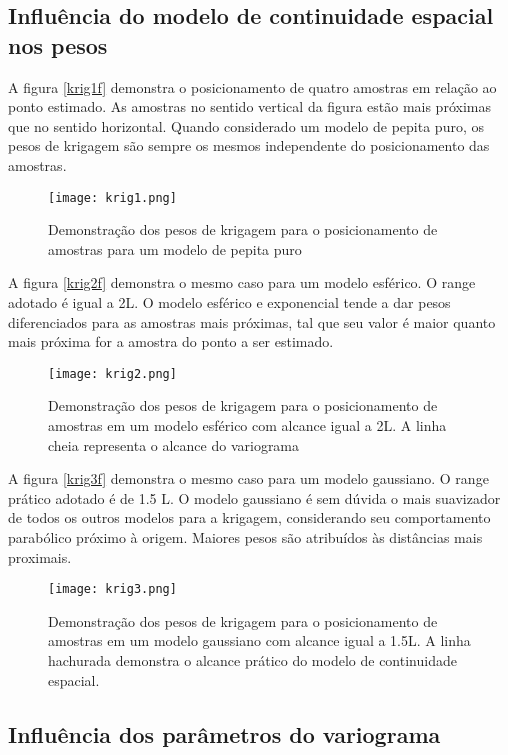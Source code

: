 \subsection{Influência do modelo de continuidade espacial nos pesos}

A figura \eqref{krig1f} demonstra o posicionamento de quatro amostras em relação ao ponto estimado. As amostras no sentido vertical da figura estão mais próximas que no sentido horizontal. Quando considerado um modelo de pepita puro, os pesos de krigagem são sempre os mesmos independente do posicionamento das amostras.

\begin{figure}[H]
  	\centering
  	\texttt{[image: krig1.png]}
  	\caption{Demonstração dos pesos de krigagem para o posicionamento de amostras para um modelo de pepita puro}
  	\label{krig1f}
\end{figure}

A figura \eqref{krig2f} demonstra o mesmo caso para um modelo esférico. O range adotado é igual a 2L. O modelo esférico e exponencial tende a dar pesos diferenciados para as amostras mais próximas, tal que seu valor é maior quanto mais próxima for a amostra do ponto a ser estimado. 

\begin{figure}[!]
  	\centering
  	\texttt{[image: krig2.png]}
  	\caption{Demonstração dos pesos de krigagem para o posicionamento de amostras em um modelo esférico com alcance igual a 2L. A linha cheia representa o alcance do variograma}
  	\label{krig2f}
\end{figure}

A figura \eqref{krig3f} demonstra o mesmo caso para um modelo gaussiano. O range prático adotado é de 1.5 L. O modelo gaussiano é sem dúvida o mais suavizador de todos os outros modelos para a krigagem, considerando seu comportamento parabólico  próximo à origem. Maiores pesos são atribuídos às distâncias mais proximais. 


\begin{figure}[!]
  	\centering
  	\texttt{[image: krig3.png]}
  	\caption{Demonstração dos pesos de krigagem para o posicionamento de amostras em um modelo gaussiano com alcance igual a 1.5L. A linha hachurada demonstra o alcance prático do modelo de continuidade espacial.}
  	\label{krig3f}
\end{figure}

\subsection{Influência dos parâmetros do variograma}

